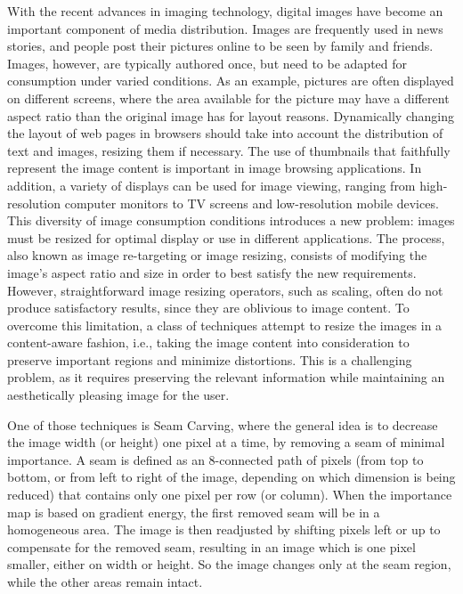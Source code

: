 \documentclass[conference]{acmsiggraph}
\begin{document}
With the recent advances in imaging technology, digital images have become an important component of media distribution. Images are frequently used in news stories, and people post their pictures online to be seen by family and friends. Images, however, are typically authored once, but need to be adapted for consumption under varied conditions. As an example, pictures are often displayed on different screens, where the area available for the picture may have a different aspect ratio than the original image has for layout reasons. Dynamically changing the layout of web pages in browsers should take into account the distribution of text and images, resizing them if necessary. The use of thumbnails that faithfully represent the image content is important in image browsing applications. In addition, a variety of displays can be used for image viewing, ranging from high-resolution computer monitors to TV screens and low-resolution mobile devices. This diversity of image consumption conditions introduces a new problem: images must be resized for optimal
display or use in different applications. The process, also known as image re-targeting or image resizing, consists of modifying the image’s aspect ratio and size in order to best satisfy the new requirements. However,
straightforward image resizing operators, such as scaling, often do not produce satisfactory results, since they are oblivious to image content. To overcome this limitation, a class of techniques attempt to resize the images in a content-aware fashion, i.e., taking the image content into consideration to preserve important regions and minimize distortions. This is a challenging problem, as it requires preserving the relevant information while maintaining an aesthetically pleasing image for the user.

One of those techniques is Seam Carving, where the general idea is to decrease the image width (or height) one pixel at a time, by removing a seam of minimal importance. A seam is defined as an 8-connected path of pixels (from top to bottom, or from left to right of the image, depending on which dimension is being reduced) that contains only one pixel per row (or column). When the importance map is based on gradient energy, the first removed seam will be in a homogeneous area. The image is then readjusted by shifting pixels left or up to compensate for the removed
seam, resulting in an image which is one pixel smaller, either on width or height. So the image changes only at the seam region, while the other areas remain intact. 
\end{document}
